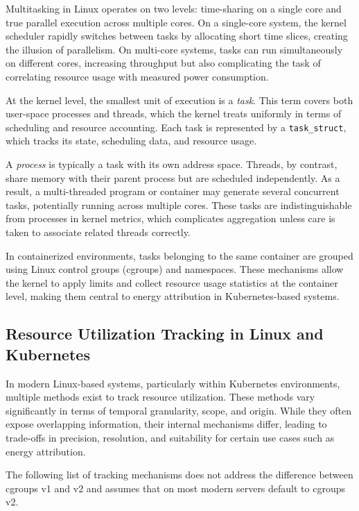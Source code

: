 Multitasking in Linux operates on two levels: time-sharing on a single core and true parallel execution across multiple cores. On a single-core system, the kernel scheduler rapidly switches between tasks by allocating short time slices, creating the illusion of parallelism. On multi-core systems, tasks can run simultaneously on different cores, increasing throughput but also complicating the task of correlating resource usage with measured power consumption.

At the kernel level, the smallest unit of execution is a \emph{task}. This term covers both user-space processes and threads, which the kernel treats uniformly in terms of scheduling and resource accounting. Each task is represented by a \texttt{task\_struct}, which tracks its state, scheduling data, and resource usage.

A \emph{process} is typically a task with its own address space. Threads, by contrast, share memory with their parent process but are scheduled independently. As a result, a multi-threaded program or container may generate several concurrent tasks, potentially running across multiple cores. These tasks are indistinguishable from processes in kernel metrics, which complicates aggregation unless care is taken to associate related threads correctly.

In containerized environments, tasks belonging to the same container are grouped using Linux control groups (cgroups) and namespaces. These mechanisms allow the kernel to apply limits and collect resource usage statistics at the container level, making them central to energy attribution in Kubernetes-based systems.

\subsection{Resource Utilization Tracking in Linux and Kubernetes}
\label{sec:utilization_tracking}

In modern Linux-based systems, particularly within Kubernetes environments, multiple methods exist to track resource utilization. These methods vary significantly in terms of temporal granularity, scope, and origin. While they often expose overlapping information, their internal mechanisms differ, leading to trade-offs in precision, resolution, and suitability for certain use cases such as energy attribution.

The following list of tracking mechanisms does not address the difference between cgroups v1 and v2 and assumes that on most modern servers default to cgroups v2.

